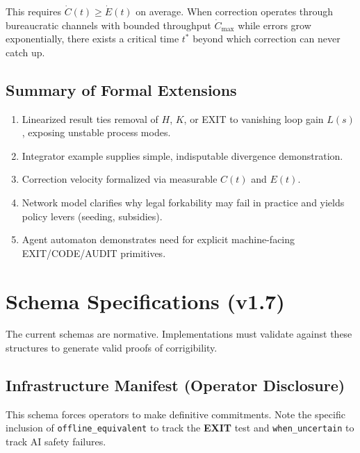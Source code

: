 \documentclass{article}
\begin{document}
This requires $\dot{C}(t) \geq \dot{E}(t)$ on average. When correction operates through bureaucratic channels with bounded throughput $\dot{C}_{\max}$ while errors grow exponentially, there exists a critical time $t^*$ beyond which correction can never catch up.

\subsection{Summary of Formal Extensions}

\begin{enumerate}
    \item Linearized result ties removal of $H$, $K$, or EXIT to vanishing loop gain $L(s)$, exposing unstable process modes.
    \item Integrator example supplies simple, indisputable divergence demonstration.
    \item Correction velocity formalized via measurable $C(t)$ and $E(t)$.
    \item Network model clarifies why legal forkability may fail in practice and yields policy levers (seeding, subsidies).
    \item Agent automaton demonstrates need for explicit machine-facing EXIT/CODE/AUDIT primitives.
\end{enumerate}

\section{Schema Specifications (v1.7)}
\label{appendix:schema}

The current schemas are normative. Implementations must validate against these structures to generate valid proofs of corrigibility.

\subsection{Infrastructure Manifest (Operator Disclosure)}

This schema forces operators to make definitive commitments. Note the specific inclusion of \texttt{offline\_equivalent} to track the \textbf{EXIT} test and \texttt{when\_uncertain} to track AI safety failures.
\end{document}
